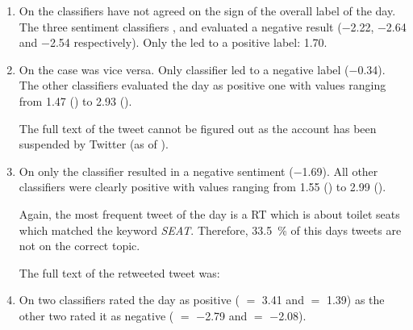 \begin{enumerate}
    \item
        On  the classifiers have not agreed on the sign of the overall label of the day.
        The three sentiment classifiers \fnb{}, \fme{} and \fsvm{} evaluated a negative result (\num{-2.22}, \num{-2.64} and \num{-2.54} respectively).
        Only the \ftb{} led to a positive label: \num{1.70}.


    \item
        On  the case was vice versa.
        Only classifier \fnb{} led to a negative label (\num{-0.34}).
        The other classifiers evaluated the day as positive one with values ranging from \num{1.47} (\ftb{}) to \num{2.93} (\fsvm{}).


        The full text of the tweet cannot be figured out as the account has been suspended by Twitter (as of ).

    \item
        On  only the \tb{} classifier resulted in a negative sentiment (\num{-1.69}).
        All other classifiers were clearly positive with values ranging from \num{1.55} (\fme{}) to \num{2.99} (\fnb{}).


        Again, the most frequent tweet of the day is a \ac{RT} which is about toilet seats which matched the keyword \emph{SEAT}.
        Therefore, \SI{33.5}{\percent} of this days tweets are not on the correct topic.

        The full text of the retweeted tweet was:

    \item
        On  two classifiers rated the day as positive (\ftb{} $=$ \num{3.41} and \fme{} $=$ \num{1.39}) as the other two rated it as negative (\fnb{} $=$ \num{-2.79} and \fsvm{} $=$ \num{-2.08}).    


\end{enumerate}
